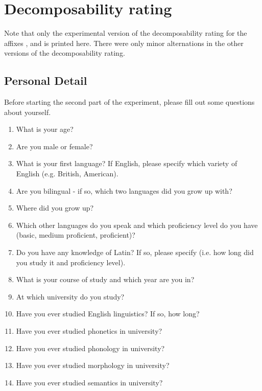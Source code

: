 
\appendix
\addappheadtotoc

\appendixpage

\chapter{Decomposability rating}\label{Appendix A: Decomposability Rating}
Note that only the experimental version of the {decomposability rating} for the affixes ,  and  is printed here. There were only minor alternations in the other versions of the {decomposability rating}.
\section{Personal Detail}
Before starting the second part of the experiment, please fill out some questions about yourself.

\begin{enumerate}
	\item What is your age?
	\item Are you male or female?
	\item What is your first language?  If English, please specify which variety of English (e.g. British, American).	
	\item Are you bilingual - if so, which two languages did you grow up with?	
	\item Where did you grow up?
	\item Which other languages do you speak and which proficiency level do you have (basic, medium proficient, proficient)?
	\item Do you have any knowledge of Latin? If so, please specify (i.e. how long did you study it and proficiency level).
	\item What is your course of study and which year are you in?
	\item At which university do you study?
	\item Have you ever studied English linguistics? If so, how long?
	\item Have you ever studied phonetics in university?
	\item Have you ever studied phonology in university?
	\item Have you ever studied morphology in university?
	\item Have you ever studied semantics in university?
	
\end{enumerate}
